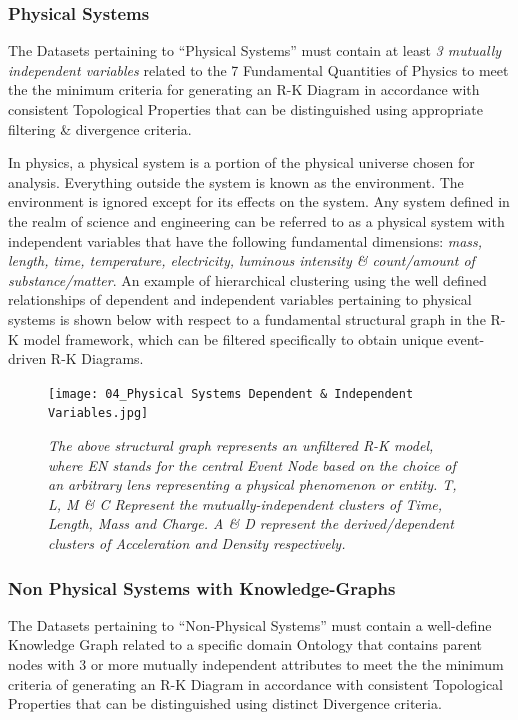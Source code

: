 \subsubsection{Physical Systems}
\label{sec:PhysicalSystems}

The Datasets pertaining to “Physical Systems” must contain at least \textit{3 mutually independent variables} related to the 7 Fundamental Quantities of Physics \cite{23.0_DimensionalAnalysis} to meet the the minimum criteria for generating an  R-K Diagram in accordance with consistent Topological Properties that can be distinguished using appropriate filtering \& divergence criteria.

In physics, a physical system is a portion of the physical universe chosen for analysis. Everything outside the system is known as the environment. The environment is ignored except for its effects on the system. Any system defined in the realm of science and engineering can be referred to as a physical system with independent variables that have the following fundamental dimensions: \textit{mass, length, time, temperature, electricity, luminous intensity \& count/amount of substance/matter}. \cite{23.1_7FundamentalQuants} An example of hierarchical clustering using the well defined relationships of dependent and independent variables pertaining to physical systems is shown below with respect to a fundamental structural graph in the R-K model framework, which can be filtered specifically to obtain unique event-driven R-K Diagrams. 

\begin{figure}[H]
	\centering
	\texttt{[image: 04\_Physical Systems Dependent \& Independent Variables.jpg]}
	\caption{\textit{The above structural graph represents an unfiltered R-K model, where EN stands for the central Event Node based on the choice of an arbitrary lens representing a physical phenomenon or entity. T, L, M \& C Represent the mutually-independent clusters  of Time, Length, Mass and Charge. A \& D represent the derived/dependent clusters of Acceleration and Density respectively.}}
	\label{fig:PhysicalSystems}
\end{figure}

\subsubsection{Non Physical Systems with Knowledge-Graphs}
\label{sec:NonPhysical}

The Datasets pertaining to “Non-Physical Systems” must contain a well-define Knowledge Graph related to a specific domain Ontology that contains parent nodes with 3 or more mutually independent attributes to meet the the minimum criteria of  generating an  R-K Diagram in accordance with consistent Topological Properties that can be distinguished using distinct Divergence criteria.

